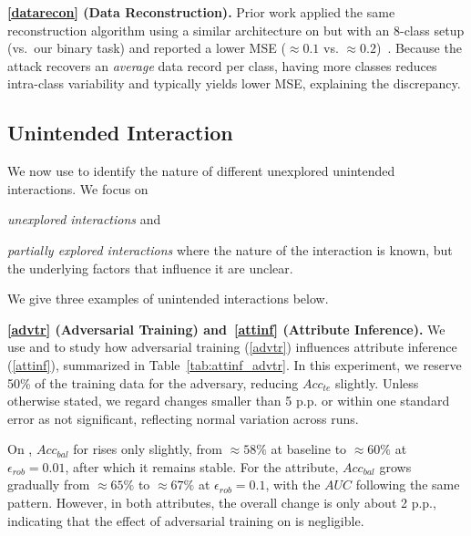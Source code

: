 \noindent\textbf{\ref{datarecon} (Data Reconstruction).}
Prior work applied the same reconstruction algorithm using a similar architecture on \celeba but with an 8-class setup (vs.\ our binary task) and reported a lower MSE ($\approx0.1$ vs. $\approx0.2$)~\cite{liu2022MLDoctorHolisticRisk}.
Because the attack recovers an \emph{average} data record per class, having more classes reduces intra-class variability and typically yields lower MSE, explaining the discrepancy.

% 



\subsection{Unintended Interaction}
We now use \method to identify the nature of different unexplored unintended interactions. We focus on
\begin{enumerate*}[label=\roman*),itemjoin={,\xspace}] %
\item \emph{unexplored interactions} and \item \emph{partially explored interactions} where the nature of the interaction is known, but the underlying factors that influence it are unclear.
\end{enumerate*}

We give three examples of unintended interactions below.

\noindent\textbf{\ref{advtr} (Adversarial Training) and~\ref{attinf} (Attribute Inference).}
We use \census and \lfw to study how adversarial training (\ref{advtr}) influences attribute inference (\ref{attinf}), summarized in Table~\ref{tab:attinf_advtr}.
In this experiment, we reserve 50\% of the training data for the adversary, reducing $Acc_{te}$ slightly.
Unless otherwise stated, we regard changes smaller than 5 p.p. or within one standard error as not significant, reflecting normal variation across runs.

On \census, $Acc_{bal}$ for \race rises only slightly, from $\approx58\%$ at baseline to $\approx60\%$ at $\epsilon_{rob}=0.01$, after which it remains stable.
For the \sex attribute, $Acc_{bal}$ grows gradually from $\approx65\%$ to $\approx67\%$ at $\epsilon_{rob}=0.1$, with the $AUC$ following the same pattern.
However, in both attributes, the overall change is only about 2 p.p., indicating that the effect of adversarial training on \census is negligible.



